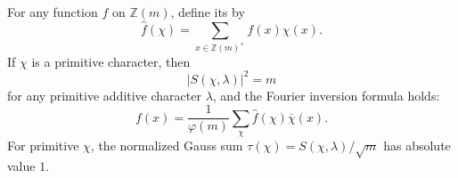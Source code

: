 For any function $f$ on $\mathbb{Z}(m)$, define its  by
$$
\widehat{f}(\chi) = \sum_{x \in \mathbb{Z}(m)^\times} f(x) \chi(x).
$$
If $\chi$ is a primitive character, then
$$
|S(\chi, \lambda)|^2 = m
$$
for any primitive additive character $\lambda$, and the Fourier inversion formula holds:
$$
f(x) = \frac{1}{\varphi(m)} \sum_{\chi} \widehat{f}(\chi) \overline{\chi}(x).
$$
For primitive $\chi$, the normalized Gauss sum $\tau(\chi) = S(\chi, \lambda)/\sqrt{m}$ has absolute value $1$.
